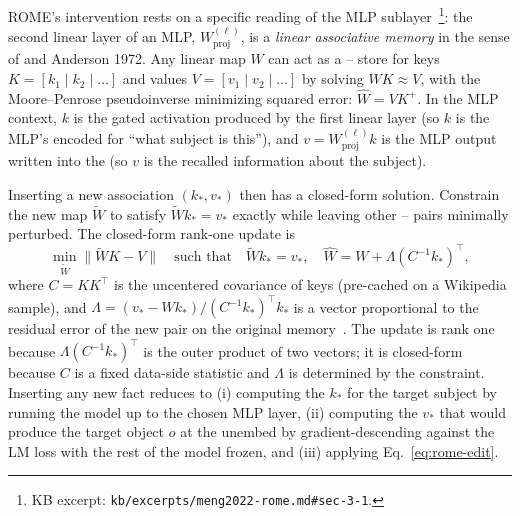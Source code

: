 ROME's intervention rests on a specific reading of the MLP
sublayer~\citep[\S 3.1]{meng2022-rome}\footnote{KB excerpt:
\texttt{kb/excerpts/meng2022-rome.md\#sec-3-1}.}: the second linear
layer of an MLP, $W^{(\ell)}_{\mathrm{proj}}$, is a \emph{linear
associative memory} in the sense of \citet{kohonen1972-associative}
and Anderson 1972. Any linear map $W$ can act as a -- store for
keys $K = [k_1 \mid k_2 \mid \ldots]$ and values $V = [v_1 \mid v_2 \mid
\ldots]$ by solving $W K \approx V$, with the Moore--Penrose
pseudoinverse minimizing squared error: $\hat{W} = V K^{+}$. In the MLP
context, $k$ is the gated activation produced by the first linear
layer (so $k$ is the MLP's encoded  for ``what subject is this''),
and $v = W^{(\ell)}_{\mathrm{proj}} k$ is the MLP output written into
the  (so $v$ is the recalled information about the
subject).

Inserting a new association $(k_*, v_*)$ then has a closed-form
solution. Constrain the new map $\tilde{W}$ to satisfy
$\tilde{W} k_* = v_*$ exactly while leaving other -- pairs
minimally perturbed. The closed-form rank-one update
\citep[\S 3.1, Eq.~2]{meng2022-rome} is
\begin{equation}
  \min_{\tilde{W}} \|\tilde{W} K - V\|
  \quad \text{such that} \quad
  \tilde{W} k_* = v_*,
  \quad
  \hat{W} = W + \Lambda (C^{-1} k_*)^\top,
  \label{eq:rome-edit}
\end{equation}
where $C = K K^\top$ is the uncentered covariance of keys (pre-cached
on a Wikipedia sample), and $\Lambda = (v_* - W k_*) / (C^{-1}
k_*)^{\top} k_*$ is a vector proportional to the residual error of the
new pair on the original memory~\citep[\S 3.1]{meng2022-rome}. The
update is rank one because $\Lambda (C^{-1} k_*)^{\top}$ is the outer
product of two vectors; it is closed-form because $C$ is a fixed
data-side statistic and $\Lambda$ is determined by the constraint.
Inserting any new fact reduces to (i) computing the  $k_*$ for the
target subject by running the model up to the chosen MLP layer,
(ii) computing the  $v_*$ that would produce the target object
$o$ at the unembed by gradient-descending against the LM loss with
the rest of the model frozen, and (iii) applying
Eq.~\eqref{eq:rome-edit}.

